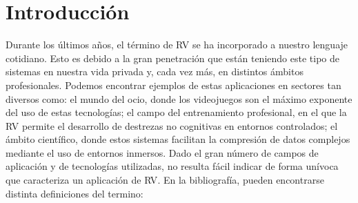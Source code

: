 \chapter{Introducción} 

\label{cap:intro}



Durante los últimos años, el término de \ac{RV} se ha incorporado a nuestro lenguaje cotidiano. Esto es debido a la gran penetración que están teniendo este tipo de sistemas en nuestra vida privada y, cada vez más, en distintos ámbitos profesionales. Podemos encontrar ejemplos de estas aplicaciones en sectores tan diversos como: el mundo del ocio, donde los videojuegos son el máximo exponente del uso de estas tecnologías; el campo del entrenamiento profesional, en el que la \ac{RV} permite el desarrollo de destrezas no cognitivas en entornos controlados; el ámbito científico, donde estos sistemas facilitan la compresión de datos complejos mediante el uso de entornos inmersos. Dado el gran número de campos de aplicación y de tecnologías utilizadas, no resulta fácil indicar de forma unívoca que caracteriza un aplicación de \ac{RV}. En la bibliografía, pueden encontrarse distinta definiciones del termino:

